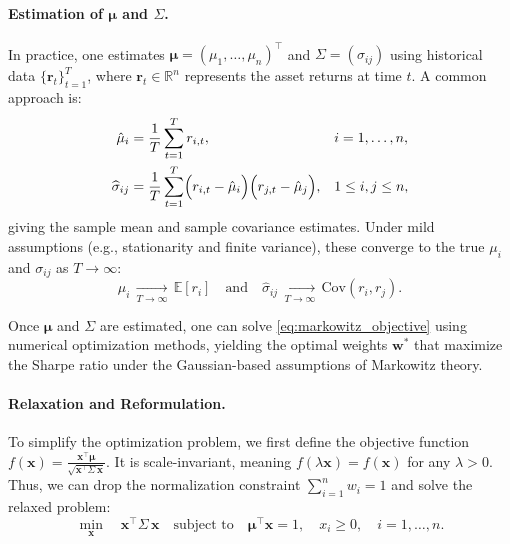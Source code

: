 \documentclass[11pt]{article}
\begin{document}
\paragraph{Estimation of \(\boldsymbol{\mu}\) and \(\Sigma\).} 
In practice, one estimates \(\boldsymbol{\mu} = (\mu_1, \dots, \mu_n)^\top\) and \(\Sigma = (\sigma_{ij})\) using historical data \(\{\mathbf{r}_t\}_{t=1}^T\), where \(\mathbf{r}_t \in \mathbb{R}^n\) represents the asset returns at time \(t\). A common approach is:
\begin{align}
    \hat{\mu}_i &= \frac{1}{T} \sum_{t=1}^{T} r_{i,t}, 
    && i = 1, \dots, n, \label{eq:sample_mean}\\
    \widehat{\sigma}_{ij} &= \frac{1}{T} \sum_{t=1}^{T} 
    \Bigl(r_{i,t} - \hat{\mu}_i\Bigr)
    \Bigl(r_{j,t} - \hat{\mu}_j\Bigr),
    && 1 \le i, j \le n, \label{eq:sample_cov}
\end{align}
giving the sample mean and sample covariance estimates. Under mild assumptions (e.g., stationarity and finite variance), these converge to the true \(\mu_i\) and \(\sigma_{ij}\) as \(T \to \infty\):
\[
    \hat{\mu}_i \,\xrightarrow[T \to \infty]{}\, \mathbb{E}[r_{i}] 
    \quad\text{and}\quad
    \widehat{\sigma}_{ij} \,\xrightarrow[T \to \infty]{}\, \mathrm{Cov}(r_i, r_j).
\]

Once \(\boldsymbol{\mu}\) and \(\Sigma\) are estimated, one can solve \eqref{eq:markowitz_objective} using numerical optimization methods, yielding the optimal weights \(\mathbf{w}^*\) that maximize the Sharpe ratio under the Gaussian-based assumptions of Markowitz theory.

\paragraph{Relaxation and Reformulation.} 
To simplify the optimization problem, we first define the objective function \(f(\mathbf{x}) =  \frac{\mathbf{x}^{\top} \boldsymbol{\mu}}{\sqrt{\mathbf{x}^{\top} \Sigma \, \mathbf{x}}}\). It is scale-invariant, meaning \(f(\lambda \mathbf{x}) = f(\mathbf{x})\) for any \(\lambda > 0\). Thus, we can drop the normalization constraint \(\sum_{i=1}^n w_i = 1\) and solve the relaxed problem:
\begin{equation}\label{eq:markowitz_relaxed}
    \min_{\mathbf{x}} \quad \mathbf{x}^{\top} \Sigma \, \mathbf{x}
    \quad 
    \text{subject to} 
    \quad
    \boldsymbol{\mu}^{\top}\mathbf{x} = 1,
    \quad x_i \ge 0, \quad i = 1, \dots, n.
\end{equation}
\end{document}
